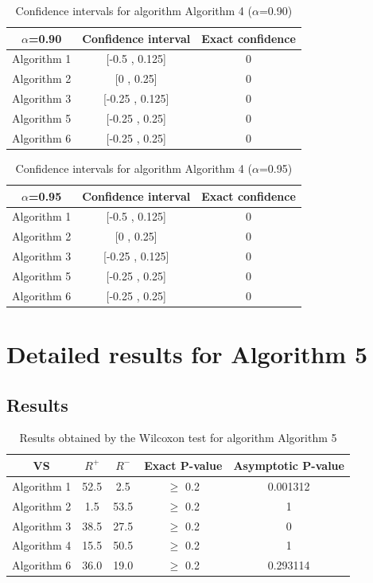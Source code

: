 \documentclass[a4paper,10pt]{article}
\begin{document}
\begin{table}[!htp]
\centering\small
\begin{tabular}{
|c|c|c|}
\hline
 $\alpha$=0.90 & Confidence interval & Exact confidence \\ \hline 
Algorithm 1 & [-0.5 , 0.125] & 0\\ \hline 
Algorithm 2 & [0 , 0.25] & 0\\ \hline 
Algorithm 3 & [-0.25 , 0.125] & 0\\ \hline 
Algorithm 5 & [-0.25 , 0.25] & 0\\ \hline 
Algorithm 6 & [-0.25 , 0.25] & 0\\ \hline 

\end{tabular}
\caption{Confidence intervals for algorithm Algorithm 4 ($\alpha$=0.90)}
\end{table}
\begin{table}[!htp]
\centering\small
\begin{tabular}{
|c|c|c|}
\hline
 $\alpha$=0.95 & Confidence interval & Exact confidence \\ \hline 
Algorithm 1 & [-0.5 , 0.125] & 0\\ \hline 
Algorithm 2 & [0 , 0.25] & 0\\ \hline 
Algorithm 3 & [-0.25 , 0.125] & 0\\ \hline 
Algorithm 5 & [-0.25 , 0.25] & 0\\ \hline 
Algorithm 6 & [-0.25 , 0.25] & 0\\ \hline 

\end{tabular}
\caption{Confidence intervals for algorithm Algorithm 4 ($\alpha$=0.95)}
\end{table}

 \clearpage 


\section{Detailed results for Algorithm 5}


\subsection{Results}

\begin{table}[!htp]
\centering\small
\begin{tabular}{
|c|c|c|c|c|}
\hline
 VS & $R^{+}$ & $R^{-}$ & Exact P-value & Asymptotic P-value \\ \hline 
Algorithm 1 & 52.5 & 2.5 & $\geq$ 0.2 & 0.001312\\ \hline 
Algorithm 2 & 1.5 & 53.5 & $\geq$ 0.2 & 1\\ \hline 
Algorithm 3 & 38.5 & 27.5 & $\geq$ 0.2 & 0\\ \hline 
Algorithm 4 & 15.5 & 50.5 & $\geq$ 0.2 & 1\\ \hline 
Algorithm 6 & 36.0 & 19.0 & $\geq$ 0.2 & 0.293114\\ \hline 

\end{tabular}
\caption{Results obtained by the Wilcoxon test for algorithm Algorithm 5}
\end{table}
\end{document}
